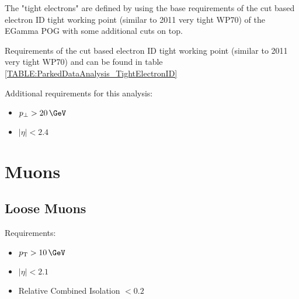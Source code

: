 
The "tight electrons" are defined by using the base requirements of the cut based electron ID tight working point (similar to 2011 very tight WP70) of the EGamma POG with some additional cuts on top.
  
Requirements of the cut based electron ID tight working point (similar to 2011 very tight WP70) and can be found in table \ref{TABLE:ParkedDataAnalysis_TightElectronID}



Additional requirements for this analysis:
\begin{itemize}
  \item $ p_{\perp} > 20\,\GeV$
  \item $ |\eta| < 2.4 $
\end{itemize}

\section{Muons}

\subsection{Loose Muons}

%

Requirements:
\begin{itemize}
  \item $\pt>10\,\GeV$
  \item $|\eta|<2.1$
  \item Relative Combined Isolation $<0.2$
\end{itemize}

